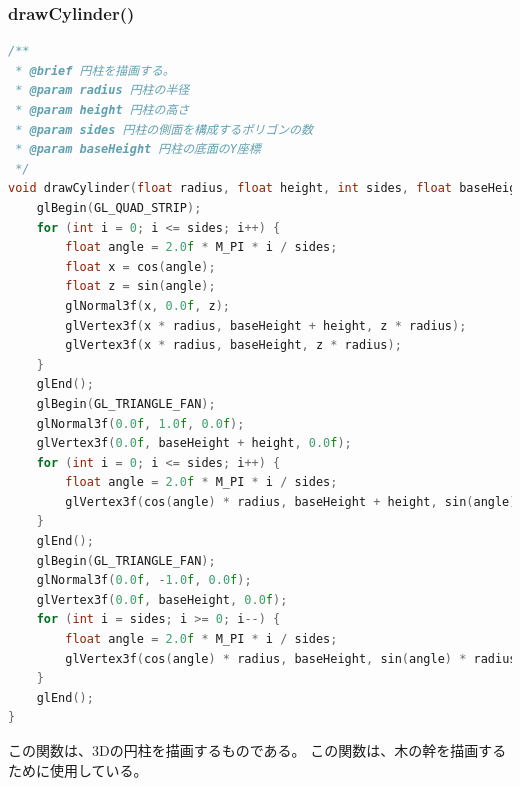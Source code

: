 \documentclass[uplatex,dvipdfmx,a4paper]{jsarticle}
\begin{document}
\hypertarget{func:drawCylinder}{}\subsubsection{drawCylinder()}\label{func:drawCylinder}
\begin{lstlisting}[language=C++, caption={drawCylinder() 関数}, label={lst:drawCylinder_detail}]
/**
 * @brief 円柱を描画する。
 * @param radius 円柱の半径
 * @param height 円柱の高さ
 * @param sides 円柱の側面を構成するポリゴンの数
 * @param baseHeight 円柱の底面のY座標
 */
void drawCylinder(float radius, float height, int sides, float baseHeight = 0.0f) {
    glBegin(GL_QUAD_STRIP);
    for (int i = 0; i <= sides; i++) {
        float angle = 2.0f * M_PI * i / sides;
        float x = cos(angle);
        float z = sin(angle);
        glNormal3f(x, 0.0f, z);
        glVertex3f(x * radius, baseHeight + height, z * radius);
        glVertex3f(x * radius, baseHeight, z * radius);
    }
    glEnd();
    glBegin(GL_TRIANGLE_FAN);
    glNormal3f(0.0f, 1.0f, 0.0f);
    glVertex3f(0.0f, baseHeight + height, 0.0f);
    for (int i = 0; i <= sides; i++) {
        float angle = 2.0f * M_PI * i / sides;
        glVertex3f(cos(angle) * radius, baseHeight + height, sin(angle) * radius);
    }
    glEnd();
    glBegin(GL_TRIANGLE_FAN);
    glNormal3f(0.0f, -1.0f, 0.0f);
    glVertex3f(0.0f, baseHeight, 0.0f);
    for (int i = sides; i >= 0; i--) {
        float angle = 2.0f * M_PI * i / sides;
        glVertex3f(cos(angle) * radius, baseHeight, sin(angle) * radius);
    }
    glEnd();
}
\end{lstlisting}
この関数は、3Dの円柱を描画するものである。
この関数は、木の幹を描画するために使用している。
\end{document}
